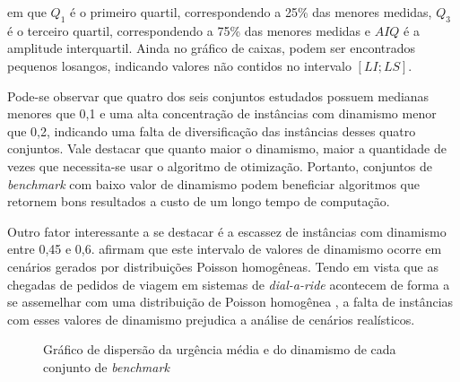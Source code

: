 \noindent em que $Q_1$ é o primeiro quartil, correspondendo a 25\% das menores 
medidas, $Q_3$ é o terceiro quartil, correspondendo a 75\% das menores medidas
e $AIQ$ é a amplitude interquartil. Ainda no gráfico de caixas, podem ser 
encontrados pequenos losangos, indicando valores não contidos no intervalo 
$[LI; LS]$.

Pode-se observar que quatro dos seis conjuntos estudados possuem medianas 
menores que 0,1 e uma alta concentração de instâncias com dinamismo menor que 
0,2, indicando uma falta de diversificação das instâncias desses quatro 
conjuntos. 
Vale destacar que quanto maior o dinamismo, maior a quantidade de vezes que
necessita-se usar o algoritmo de otimização.
Portanto, conjuntos de \textit{benchmark} com baixo valor de dinamismo podem
beneficiar algoritmos que retornem bons resultados a custo de um longo tempo de
computação.

Outro fator interessante a se destacar é a escassez de instâncias com dinamismo
entre 0,45 e 0,6. 
 afirmam que este intervalo de valores de 
dinamismo ocorre em cenários gerados por distribuições Poisson homogêneas.
Tendo em vista que as chegadas de pedidos de viagem em sistemas de 
\textit{dial-a-ride} acontecem de forma a se assemelhar com uma distribuição de
Poisson homogênea \cite{schilde_metaheuristics_2011}, a falta de instâncias 
com esses valores de dinamismo prejudica a análise de cenários realísticos.

\begin{figure}[H]
    \centering
    \caption{Gráfico de dispersão da urgência média e do dinamismo de cada 
    conjunto de \textit{benchmark}}
    \label{fig:scatterplot_instance_planing_horizon}
\end{figure}

